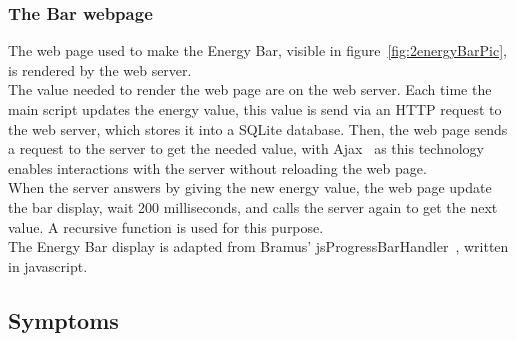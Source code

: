 \subsubsection{The Bar webpage} 

The web page used to make the Energy Bar, visible in figure~\ref{fig:2energyBarPic}, is rendered by the web server.\\
The value needed to render the web page are on the web server. Each time the main script updates the energy value, this value is send via an HTTP request to the web server, which stores it into a SQLite database. Then, the web page sends a request to the server to get the needed value, with Ajax~\cite{jqueryWebsite} as this technology enables interactions with the server without reloading the web page.\\
When the server answers by giving the new energy value, the web page update the bar display, wait 200 milliseconds, and calls the server again to get the next value. A recursive function is used for this purpose.\\
The Energy Bar display is adapted from Bramus' jsProgressBarHandler~\cite{progressBarWebsite}, written in javascript. 

\subsection{Symptoms}


% 


